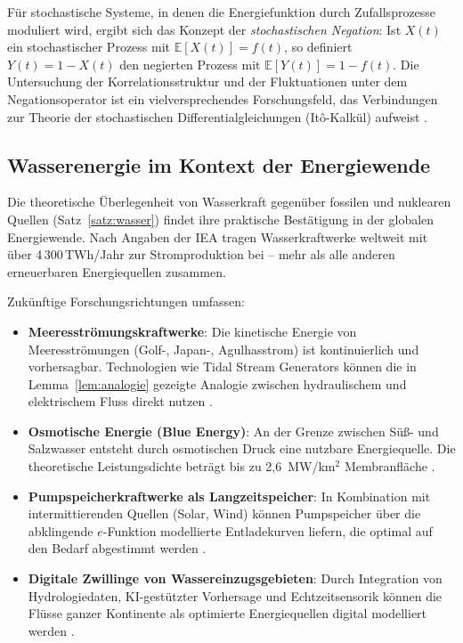 ﻿\documentclass[a4paper,12pt]{article}
\theoremstyle{definition}
\begin{document}
F\"ur stochastische Systeme, in denen die Energiefunktion durch Zufallsprozesse
moduliert wird, ergibt sich das Konzept der \emph{stochastischen Negation}: Ist
$X(t)$ ein stochastischer Prozess mit $\mathbb{E}[X(t)] = f(t)$, so definiert
$Y(t) = 1 - X(t)$ den negierten Prozess mit $\mathbb{E}[Y(t)] = 1 - f(t)$.
Die Untersuchung der Korrelationsstruktur und der Fluktuationen unter dem
Negationsoperator ist ein vielversprechendes Forschungsfeld, das Verbindungen zur
Theorie der stochastischen Differentialgleichungen (It\^o-Kalk\"ul) aufweist
\cite{Oksendal2003}.

\subsection{Wasserenergie im Kontext der Energiewende}

Die theoretische \"Uberlegenheit von Wasserkraft gegen\"uber fossilen und nuklearen
Quellen (Satz~\ref{satz:wasser}) findet ihre praktische Best\"atigung in der globalen
Energiewende. Nach Angaben der IEA \cite{IEA2023} tragen Wasserkraftwerke weltweit
mit \"uber 4\,300\,TWh/Jahr zur Stromproduktion bei -- mehr als alle anderen
erneuerbaren Energiequellen zusammen.

Zuk\"unftige Forschungsrichtungen umfassen:

\begin{itemize}
    \item \textbf{Meeresstr\"omungskraftwerke}: Die kinetische Energie von
          Meeresstr\"omungen (Golf-, Japan-, Agulhasstrom) ist kontinuierlich und
          vorhersagbar. Technologien wie Tidal Stream Generators k\"onnen die in
          Lemma~\ref{lem:analogie} gezeigte Analogie zwischen hydraulischem und
          elektrischem Fluss direkt nutzen \cite{Khan2009}.
    \item \textbf{Osmotische Energie (Blue Energy)}: An der Grenze zwischen S\"u\ss{}- und
          Salzwasser entsteht durch osmotischen Druck eine nutzbare Energiequelle.
          Die theoretische Leistungsdichte betr\"agt bis zu 2,6~MW/km$^2$ Membranfl\"ache
          \cite{Post2007}.
    \item \textbf{Pumpspeicherkraftwerke als Langzeitspeicher}: In Kombination mit
          intermittierenden Quellen (Solar, Wind) k\"onnen Pumpspeicher \"uber die
          abklingende $e$-Funktion modellierte Entladekurven liefern, die optimal
          auf den Bedarf abgestimmt werden \cite{Rehman2015}.
    \item \textbf{Digitale Zwillinge von Wassereinzugsgebieten}: Durch Integration
          von Hydrologiedaten, KI-gest\"utzter Vorhersage und Echtzeitsensorik k\"onnen
          die Fl\"usse ganzer Kontinente als optimierte Energiequellen digital modelliert
          werden \cite{Grieves2017}.
\end{itemize}
\end{document}
